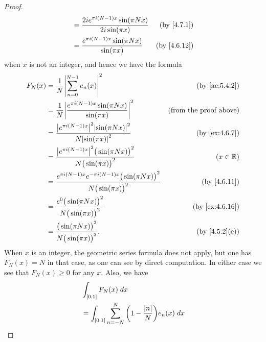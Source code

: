 \begin{proof}
\begin{align*}
                                & = \frac{2i e^{\pi i (N - 1) x} \sin(\pi N x)}{2i \sin(\pi x)}                                                           & \text{(by \cref{4.7.1})}     \\
                                & = \frac{e^{\pi i (N - 1) x} \sin(\pi N x)}{\sin(\pi x)}                                                                 & \text{(by \cref{4.6.12})}
  \end{align*}
  when \(x\) is not an integer, and hence we have the formula
  \begin{align*}
    F_N(x) & = \frac{1}{N} \abs{\sum_{n = 0}^{N - 1} e_n(x)}^2                                                       & \text{(by \cref{ac:5.4.2})}   \\
           & = \frac{1}{N} \abs{\frac{e^{\pi i (N - 1) x} \sin(\pi N x)}{\sin(\pi x)}}^2                             & \text{(from the proof above)} \\
           & = \frac{\abs{e^{\pi i (N - 1) x}}^2 \abs{\sin(\pi N x)}^2}{N \abs{\sin(\pi x)}^2}                       & \text{(by \cref{ex:4.6.7})}   \\
           & = \frac{\abs{e^{\pi i (N - 1) x}}^2 \big(\sin(\pi N x)\big)^2}{N \big(\sin(\pi x)\big)^2}               & (x \in \R)                    \\
           & = \frac{e^{\pi i (N - 1) x} e^{- \pi i (N - 1) x} \big(\sin(\pi N x)\big)^2}{N \big(\sin(\pi x)\big)^2} & \text{(by \cref{4.6.11})}     \\
           & = \frac{e^0 \big(\sin(\pi N x)\big)^2}{N \big(\sin(\pi x)\big)^2}                                       & \text{(by \cref{ex:4.6.16})}  \\
           & = \frac{\big(\sin(\pi N x)\big)^2}{N \big(\sin(\pi x)\big)^2}.                                          & \text{(by \cref{4.5.2}(e))}
  \end{align*}
  When \(x\) is an integer, the geometric series formula does not apply, but one has \(F_N(x) = N\) in that case, as one can see by direct computation.
  In either case we see that \(F_N(x) \geq 0\) for any \(x\).
  Also, we have
  \begin{align*}
     & \int_{[0, 1]} F_N(x) \; dx                                                                                                                           \\
     & = \int_{[0, 1]} \sum_{n = -N}^N \bigg(1 - \frac{\abs{n}}{N}\bigg) e_n(x) \; dx                                                                       \\

\end{align*}
\end{proof}
